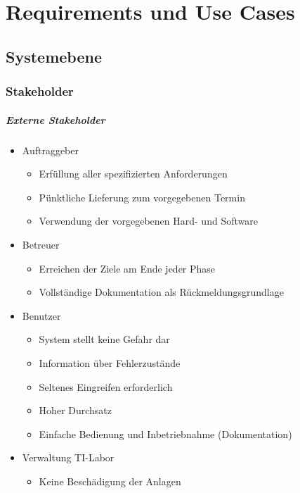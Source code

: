 \chapter{Requirements und Use Cases}\label{ch:requirements-und-use-cases}

\section{Systemebene}\label{sec:systemebene}


\subsection{Stakeholder}\label{subsec:stakeholder}


\paragraph{Externe Stakeholder}
\begin{itemize}
    \item Auftraggeber
    \begin{itemize}
        \item Erfüllung aller spezifizierten Anforderungen
        \item Pünktliche Lieferung zum vorgegebenen Termin
        \item Verwendung der vorgegebenen Hard- und Software
    \end{itemize}
    \item Betreuer
    \begin{itemize}
        \item Erreichen der Ziele am Ende jeder Phase
        \item Vollständige Dokumentation als Rückmeldungsgrundlage
    \end{itemize}
    \item Benutzer
    \begin{itemize}
        \item System stellt keine Gefahr dar
        \item Information über Fehlerzustände
        \item Seltenes Eingreifen erforderlich
        \item Hoher Durchsatz
        \item Einfache Bedienung und Inbetriebnahme (Dokumentation)
    \end{itemize}
    \item Verwaltung TI-Labor
    \begin{itemize}
        \item Keine Beschädigung der Anlagen
    \end{itemize}
\end{itemize}

